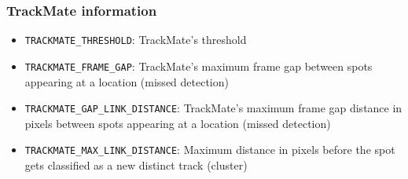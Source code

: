 \subsubsection*{TrackMate information}
\begin{itemize}
  \item \verb|TRACKMATE_THRESHOLD|: TrackMate's threshold
  \item \verb|TRACKMATE_FRAME_GAP|: TrackMate's maximum frame gap between spots appearing at a location (missed detection)
  \item \verb|TRACKMATE_GAP_LINK_DISTANCE|: TrackMate's maximum frame gap distance in pixels between spots appearing at a location (missed detection)
  \item \verb|TRACKMATE_MAX_LINK_DISTANCE|: Maximum distance in pixels before the spot gets classified as a new distinct track (cluster)
\end{itemize}
